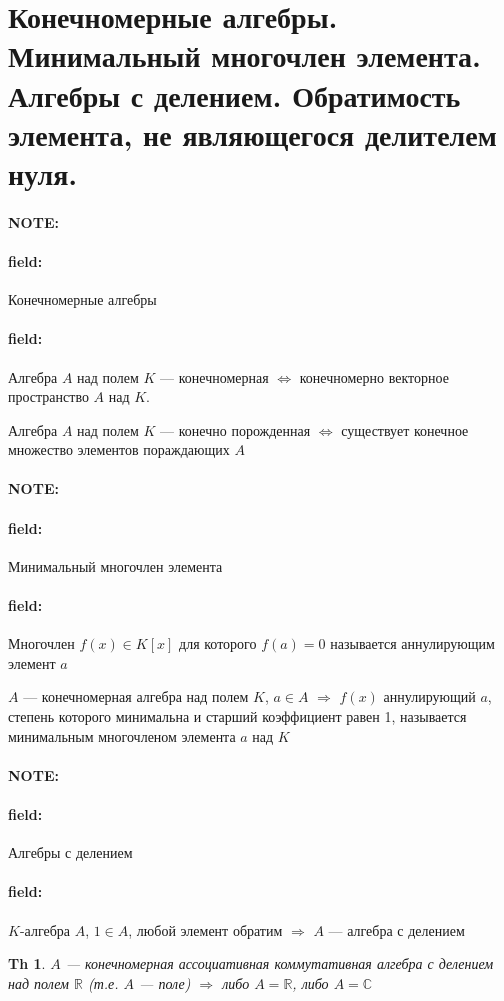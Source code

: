 \documentclass[12pt]{article}
\newenvironment{note}{\paragraph{NOTE:}}{}
\newenvironment{field}{\paragraph{field:}}{}
\newtheorem{theorem}{Th}
\begin{document}
\section{Конечномерные алгебры. Минимальный многочлен элемента. Алгебры с
делением. Обратимость элемента, не являющегося делителем нуля.}

\begin{note}
  \begin{field}
    Конечномерные алгебры
  \end{field}
  \begin{field}
    Алгебра $A$ над полем $K$ --- конечномерная
    $\Leftrightarrow$
    конечномерно векторное пространство $A$ над $K$.

    Алгебра $A$ над полем $K$ --- конечно порожденная
    $\Leftrightarrow$
    существует конечное множество элементов пораждающих $A$
  \end{field}
\end{note}

\begin{note}
  \begin{field}
    Минимальный многочлен элемента
  \end{field}
  \begin{field}
    Многочлен $f(x) \in K[x]$ для которого $f(a) = 0$
    называется аннулирующим элемент $a$

    $A$ --- конечномерная алгебра над полем $K$, $a \in A$ $\Rightarrow$ $f(x)$
    аннулирующий $a$, степень которого минимальна и старший коэффициент равен 1,
    называется минимальным многочленом элемента $a$ над $K$
  \end{field}
\end{note}

\begin{note}
  \begin{field}
    Алгебры с делением
  \end{field}
  \begin{field}
    $K$-алгебра $A$, $1 \in A$, любой элемент обратим
    $\Rightarrow$ $A$ --- алгебра с делением

    \begin{theorem}
      $A$ --- конечномерная ассоциативная коммутативная алгебра с делением над полем $\mathbb{R}$ (т.е. $A$ --- поле)
      $\Rightarrow$
      либо $A = \mathbb{R}$, либо $A = \mathbb{C}$
    \end{theorem}
  \end{field}
\end{note}
\end{document}
